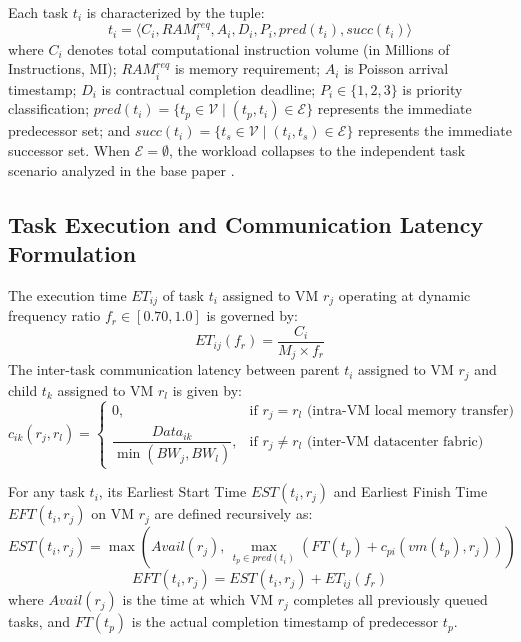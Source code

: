 \documentclass[default,sn-mathphys-num]{sn-jnl}
\theoremstyle{thmstyleone}
\theoremstyle{thmstyletwo}
\theoremstyle{thmstylethree}
\begin{document}
Each task $t_i$ is characterized by the tuple:
\begin{equation}
t_i = \langle C_i, RAM_i^{req}, A_i, D_i, P_i, pred(t_i), succ(t_i) \rangle
\end{equation}
where $C_i$ denotes total computational instruction volume (in Millions of Instructions, MI); $RAM_i^{req}$ is memory requirement; $A_i$ is Poisson arrival timestamp; $D_i$ is contractual completion deadline; $P_i \in \{1, 2, 3\}$ is priority classification; $pred(t_i) = \{t_p \in \mathcal{V} \mid (t_p, t_i) \in \mathcal{E}\}$ represents the immediate predecessor set; and $succ(t_i) = \{t_s \in \mathcal{V} \mid (t_i, t_s) \in \mathcal{E}\}$ represents the immediate successor set. When $\mathcal{E} = \emptyset$, the workload collapses to the independent task scenario analyzed in the base paper \cite{narsimhulu2026hybrid}.

\subsection{Task Execution and Communication Latency Formulation}
The execution time $ET_{ij}$ of task $t_i$ assigned to VM $r_j$ operating at dynamic frequency ratio $f_r \in [0.70, 1.0]$ is governed by:
\begin{equation}\label{eq:et}
ET_{ij}(f_r) = \frac{C_i}{M_j \times f_r}
\end{equation}
The inter-task communication latency between parent $t_i$ assigned to VM $r_j$ and child $t_k$ assigned to VM $r_l$ is given by:
\begin{equation}\label{eq:comm}
c_{ik}(r_j, r_l) = 
\begin{cases}
0, & \text{if } r_j = r_l \text{ (intra-VM local memory transfer)} \\
\dfrac{Data_{ik}}{\min(BW_j, BW_l)}, & \text{if } r_j \neq r_l \text{ (inter-VM datacenter fabric)}
\end{cases}
\end{equation}

For any task $t_i$, its Earliest Start Time $EST(t_i, r_j)$ and Earliest Finish Time $EFT(t_i, r_j)$ on VM $r_j$ are defined recursively as:
\begin{equation}\label{eq:est}
EST(t_i, r_j) = \max \left( Avail(r_j), \, \max_{t_p \in pred(t_i)} \left( FT(t_p) + c_{pi}(vm(t_p), r_j) \right) \right)
\end{equation}
\begin{equation}\label{eq:eft}
EFT(t_i, r_j) = EST(t_i, r_j) + ET_{ij}(f_r)
\end{equation}
where $Avail(r_j)$ is the time at which VM $r_j$ completes all previously queued tasks, and $FT(t_p)$ is the actual completion timestamp of predecessor $t_p$.
\end{document}
